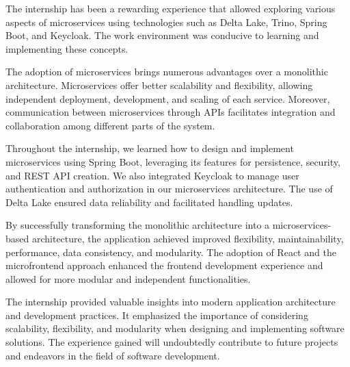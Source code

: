 \conclusion

The internship has been a rewarding experience that allowed exploring various aspects of microservices using technologies such as Delta Lake, Trino, Spring Boot, and Keycloak. The work environment was conducive to learning and implementing these concepts.

The adoption of microservices brings numerous advantages over a monolithic architecture. Microservices offer better scalability and flexibility, allowing independent deployment, development, and scaling of each service. Moreover, communication between microservices through APIs facilitates integration and collaboration among different parts of the system.

Throughout the internship, we learned how to design and implement microservices using Spring Boot, leveraging its features for persistence, security, and REST API creation. We also integrated Keycloak to manage user authentication and authorization in our microservices architecture. The use of Delta Lake ensured data reliability and facilitated handling updates.

By successfully transforming the monolithic architecture into a microservices-based architecture, the application achieved improved flexibility, maintainability, performance, data consistency, and modularity. The adoption of React and the microfrontend approach enhanced the frontend development experience and allowed for more modular and independent functionalities.

The internship provided valuable insights into modern application architecture and development practices. It emphasized the importance of considering scalability, flexibility, and modularity when designing and implementing software solutions. The experience gained will undoubtedly contribute to future projects and endeavors in the field of software development.